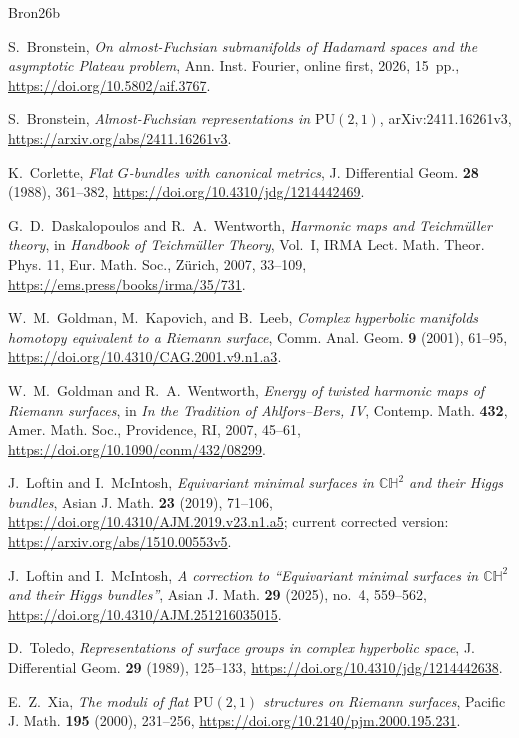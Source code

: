 \documentclass[12pt]{amsart}
\theoremstyle{remark}
\newcommand{\CH}{\mathbb{CH}}
\newcommand{\PU}{\mathrm{PU}}
\begin{document}
\begin{thebibliography}{Bron26b}

S.~Bronstein,
\emph{On almost-Fuchsian submanifolds of Hadamard spaces and the asymptotic
Plateau problem},
Ann. Inst. Fourier, online first,  2026, 15~pp.,
\url{https://doi.org/10.5802/aif.3767}.

S.~Bronstein,
\emph{Almost-Fuchsian representations in $\PU(2,1)$},
arXiv:2411.16261v3, 
\url{https://arxiv.org/abs/2411.16261v3}.

K.~Corlette,
\emph{Flat $G$-bundles with canonical metrics},
J. Differential Geom. \textbf{28} (1988), 361--382,
\url{https://doi.org/10.4310/jdg/1214442469}.

G.~D.~Daskalopoulos and R.~A.~Wentworth,
\emph{Harmonic maps and Teichm\"uller theory},
in \emph{Handbook of Teichm\"uller Theory}, Vol.~I,
IRMA Lect. Math. Theor. Phys. 11, Eur. Math. Soc., Z\"urich, 2007, 33--109,
\url{https://ems.press/books/irma/35/731}.

W.~M.~Goldman, M.~Kapovich, and B.~Leeb,
\emph{Complex hyperbolic manifolds homotopy equivalent to a Riemann surface},
Comm. Anal. Geom. \textbf{9} (2001), 61--95,
\url{https://doi.org/10.4310/CAG.2001.v9.n1.a3}.

W.~M.~Goldman and R.~A.~Wentworth,
\emph{Energy of twisted harmonic maps of Riemann surfaces},
in \emph{In the Tradition of Ahlfors--Bers, IV},
Contemp. Math. \textbf{432}, Amer. Math. Soc., Providence, RI, 2007, 45--61,
\url{https://doi.org/10.1090/conm/432/08299}.

J.~Loftin and I.~McIntosh,
\emph{Equivariant minimal surfaces in $\CH^2$ and their Higgs bundles},
Asian J. Math. \textbf{23} (2019), 71--106,
\url{https://doi.org/10.4310/AJM.2019.v23.n1.a5}; current corrected version:
\url{https://arxiv.org/abs/1510.00553v5}.

J.~Loftin and I.~McIntosh,
\emph{A correction to ``Equivariant minimal surfaces in $\CH^2$ and their
Higgs bundles''},
Asian J. Math. \textbf{29} (2025), no.~4, 559--562,
\url{https://doi.org/10.4310/AJM.251216035015}.

D.~Toledo,
\emph{Representations of surface groups in complex hyperbolic space},
J. Differential Geom. \textbf{29} (1989), 125--133,
\url{https://doi.org/10.4310/jdg/1214442638}.

E.~Z.~Xia,
\emph{The moduli of flat $\PU(2,1)$ structures on Riemann surfaces},
Pacific J. Math. \textbf{195} (2000), 231--256,
\url{https://doi.org/10.2140/pjm.2000.195.231}.

\end{thebibliography}
\end{document}
